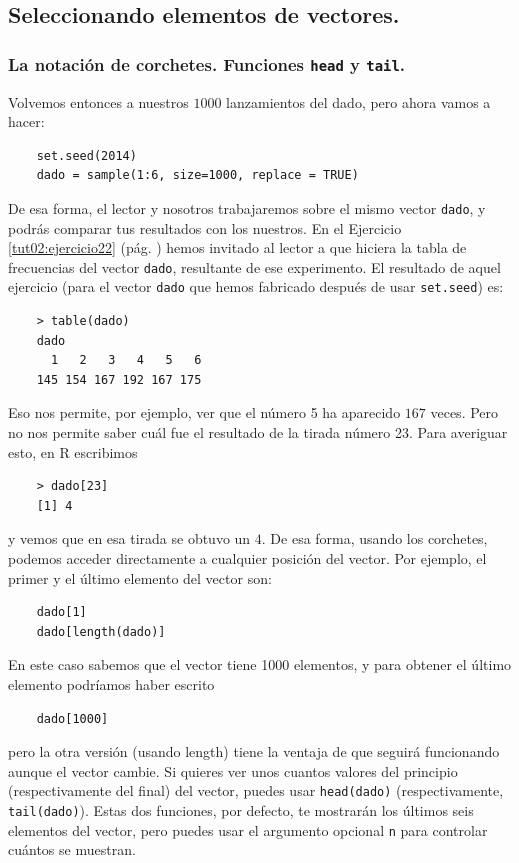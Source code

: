 \documentclass[10pt,a4paper]{article}\usepackage[]{graphicx}\usepackage[]{color}
\newcounter {cont01}
\begin{document}

\subsection{Seleccionando elementos de vectores.}

\subsubsection*{La notación de corchetes. Funciones {\tt head} y {\tt tail}.}

Volvemos entonces a nuestros $1000$ lanzamientos del dado, pero ahora vamos a hacer:
\begin{verbatim}
    set.seed(2014)
    dado = sample(1:6, size=1000, replace = TRUE)
\end{verbatim}
De esa forma,  el lector y nosotros trabajaremos sobre el mismo vector {\tt dado}, y podrás comparar tus resultados con los nuestros. En el Ejercicio \ref{tut02:ejercicio22} (pág. \pageref{tut02:ejercicio22}) hemos invitado al lector a que hiciera la tabla de frecuencias del vector {\tt dado}, resultante de ese experimento. El resultado de aquel ejercicio (para el vector {\tt dado} que hemos fabricado después de usar {\tt set.seed}) es:
\begin{verbatim}
    > table(dado)
    dado
      1   2   3   4   5   6
    145 154 167 192 167 175
\end{verbatim}
Eso nos permite, por ejemplo, ver que el número 5 ha aparecido $167$ veces. Pero no nos permite saber cuál fue el resultado de la tirada número 23.  Para averiguar esto, en R escribimos
\begin{verbatim}
    > dado[23]
    [1] 4
\end{verbatim}
y vemos que en esa tirada se obtuvo un $4$. De esa forma, usando los corchetes, podemos acceder directamente a cualquier posición del vector. Por ejemplo, el primer y el último elemento del vector son:
\begin{verbatim}
    dado[1]
    dado[length(dado)]
\end{verbatim}
En este caso sabemos que el vector tiene 1000 elementos, y para obtener el último elemento podríamos haber escrito
\begin{verbatim}
    dado[1000]
\end{verbatim}
pero la otra versión (usando length) tiene la ventaja de que seguirá funcionando aunque el vector cambie. Si quieres ver unos cuantos valores del principio (respectivamente del final) del vector, puedes usar {\tt head(dado)} (respectivamente, {\tt tail(dado)}). Estas dos funciones, por defecto, te mostrarán los últimos seis elementos del vector, pero puedes usar el argumento opcional {\tt n} para controlar cuántos se muestran.
\end{document}
